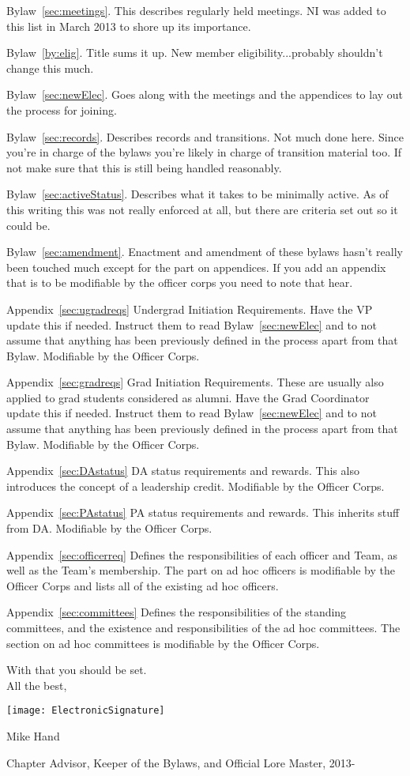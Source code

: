 \begin{preface}
Bylaw~\ref{sec:meetings}. This describes regularly held meetings. NI was added to this list in March 2013 to shore up its importance.

Bylaw~\ref{by:elig}. Title sums it up. New member eligibility...probably shouldn't change this much.

Bylaw~\ref{sec:newElec}. Goes along with the meetings and the appendices to lay out the process for joining.

Bylaw~\ref{sec:records}. Describes records and transitions. Not much done here. Since you're in charge of the bylaws you're likely in charge of transition material too. If not make sure that this is still being handled reasonably.

Bylaw~\ref{sec:activeStatus}. Describes what it takes to be minimally active. As of this writing this was not really enforced at all, but there are criteria set out so it could be.

Bylaw~\ref{sec:amendment}. Enactment and amendment of these bylaws hasn't really been touched much except for the part on appendices. If you add an appendix that is to be modifiable by the officer corps you need to note that hear.

Appendix~\ref{sec:ugradreqs} Undergrad  Initiation Requirements. Have the VP update this if needed. Instruct them to read Bylaw~\ref{sec:newElec} and to not assume that anything has been previously defined in the process apart from that Bylaw. Modifiable by the Officer Corps.

Appendix~\ref{sec:gradreqs} Grad  Initiation Requirements. These are usually also applied to grad students considered as alumni. Have the Grad Coordinator update this if needed. Instruct them to read Bylaw~\ref{sec:newElec} and to not assume that anything has been previously defined in the process apart from that Bylaw. Modifiable by the Officer Corps.

Appendix~\ref{sec:DAstatus} DA status requirements and rewards. This also introduces the concept of a leadership credit. Modifiable by the Officer Corps.

Appendix~\ref{sec:PAstatus} PA status requirements and rewards. This inherits stuff from DA. Modifiable by the Officer Corps.

Appendix~\ref{sec:officerreq} Defines the responsibilities of each officer and Team, as well as the Team's membership. The part on ad hoc officers is modifiable by the Officer Corps and lists all of the existing ad hoc officers.

Appendix~\ref{sec:committees} Defines the responsibilities of the standing committees, and the existence and responsibilities of the ad hoc committees. The section on ad hoc committees is modifiable by the Officer Corps.

With that you should be set.\\

 All the best,

\texttt{[image: ElectronicSignature]}

Mike Hand

Chapter Advisor, Keeper of the Bylaws, and Official Lore Master, 2013-

\newpage
\end{preface}
